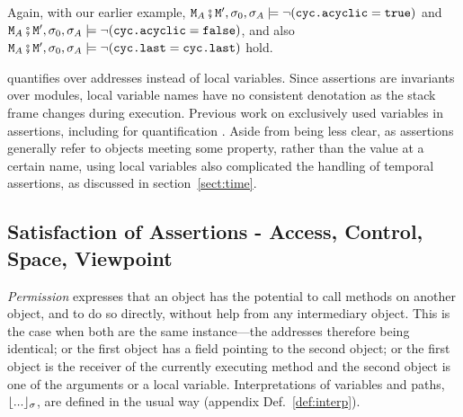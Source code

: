 \noindent
Again, with our earlier example,  
${\mbox{\tt{\ensuremath{{\mbox{\tt{M}}}}}}}_A\fatsemi {\mbox{\tt{\ensuremath{{\mbox{\tt{M}}}}}}}', \sigma_0 , \sigma_A \models \neg ({\mbox{\tt{cyc.acyclic}}}={\mbox{\tt{true}}})$    and  
${\mbox{\tt{\ensuremath{{\mbox{\tt{M}}}}}}}_A\fatsemi {\mbox{\tt{\ensuremath{{\mbox{\tt{M}}}}}}}', \sigma_0 , \sigma_A \models  \neg ({\mbox{\tt{cyc.acyclic}}}={\mbox{\tt{false}}})$, 
and also 
${\mbox{\tt{\ensuremath{{\mbox{\tt{M}}}}}}}_A\fatsemi {\mbox{\tt{\ensuremath{{\mbox{\tt{M}}}}}}}', \sigma_0 , \sigma_A \models  \neg ({\mbox{\tt{cyc.last}}}={\mbox{\tt{cyc.last}}})$
hold.

\Chainmail quantifies over addresses instead of local variables. Since \Chainmail assertions are invariants over modules, local variable names have no consistent denotation as the stack frame changes during execution. Previous work on \Chainmail exclusively used variables in assertions, including for quantification \cite{FASE}. Aside from being less clear, as assertions generally refer to objects meeting some property, rather than the value at a certain name, using local variables also complicated the handling of temporal assertions, as discussed in section~\ref{sect:time}.

\subsection{Satisfaction of Assertions - Access, Control, Space, Viewpoint}
\label{sect:pcsv} 

\textit{Permission} expresses that an object has the potential to call
methods on another object, and to do so directly, without  help from any
intermediary object. This is the case when both are the same instance---the addresses therefore being identical; or the first object has a field pointing to the second object; or
the first object is the receiver of the currently executing method and the second object is one of the 
arguments or a local variable. Interpretations of variables and paths, ${\lfloor{ {...}}\rfloor_{\sigma}}$, are defined
in the usual way (appendix Def.~\ref{def:interp}).


